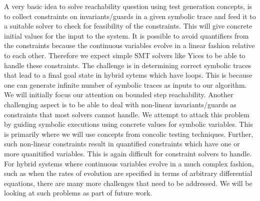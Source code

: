 A very basic idea to solve reachability question using test generation concepts, is to collect constraints on invariants/guards in a given symbolic trace and feed it to a suitable solver to check for feasibility of the constraints. This will give concrete initial values for the input to the system. It is possible to avoid quantifiers from the constraints because the continuous variables evolve in a linear fashion relative to each other. Therefore we expect simple SMT solvers like Yices to be able to handle these constraints. The challenge is in determining correct symbolic traces that lead to a final goal state in hybrid sytems which have loops. This is because one can generate infinite number of symbolic traces as inputs to our algorithm. We will initially focus our attention on bounded step reachability. Another challenging aspect is to be able to deal with non-linear invariants/guards as constraints that most solvers cannot handle. We attempt to attack this problem by guiding symbolic executions using concrete values for symbolic variables. This is primarily where we will use concepts from concolic testing techniques. Further, such non-linear constraints result in quantified constraints which have one or more quanitified variables. This is again difficult for constraint solvers to handle.  
For hybrid systems where continuous variables evolve in a much complex fashion, such as when the rates of evolution are specified in terms of arbitrary differential equations, there are many more challenges that need to be addressed. We will be looking at such problems as part of future work.  




